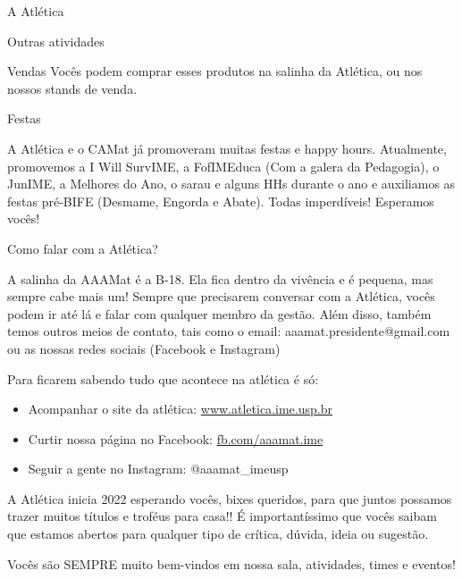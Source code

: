 \begin{secao}{A Atlética}
\begin{subsecao}{Outras atividades}
\begin{subsubsecao}{Vendas}
Vocês podem comprar esses produtos na salinha da Atlética, ou nos nossos
stands de venda.

\end{subsubsecao}
\begin{subsubsecao}{Festas}

A Atlética e o CAMat já promoveram muitas festas e happy hours. Atualmente,
promovemos a I Will SurvIME, a FofIMEduca (Com a galera da Pedagogia), o 
JunIME, a Melhores do Ano, o sarau e alguns HHs durante o ano e auxiliamos 
as festas pré-BIFE (Desmame, Engorda e Abate). Todas imperdíveis!
Esperamos vocês!

\end{subsubsecao}
\begin{subsubsecao}{Como falar com a Atlética?}

A salinha da AAAMat é a B-18. Ela fica dentro da vivência e é pequena, mas
sempre cabe mais um! Sempre que precisarem conversar com a Atlética, vocês
podem ir até lá e falar com qualquer membro da gestão. Além disso, também temos
outros meios de contato, tais como o email: aaamat.presidente@gmail.com  ou as
nossas redes sociais (Facebook e Instagram)

Para ficarem sabendo tudo que acontece na atlética é só:

\begin{itemize}
  \item Acompanhar o site da atlética: \url{www.atletica.ime.usp.br}
  \item Curtir nossa página no Facebook: \url{fb.com/aaamat.ime}
  \item Seguir a gente no Instagram: @aaamat\_imeusp
\end{itemize}

A Atlética inicia 2022 esperando vocês, bixes queridos, para que juntos
possamos trazer muitos títulos e troféus para casa!! É importantíssimo que
vocês saibam que estamos abertos para qualquer tipo de crítica, dúvida, ideia
ou sugestão.

Vocês são SEMPRE muito bem-vindos em nossa sala, atividades, times e eventos!
\end{subsubsecao}
\end{subsecao}
\end{secao}
\pagebreak
